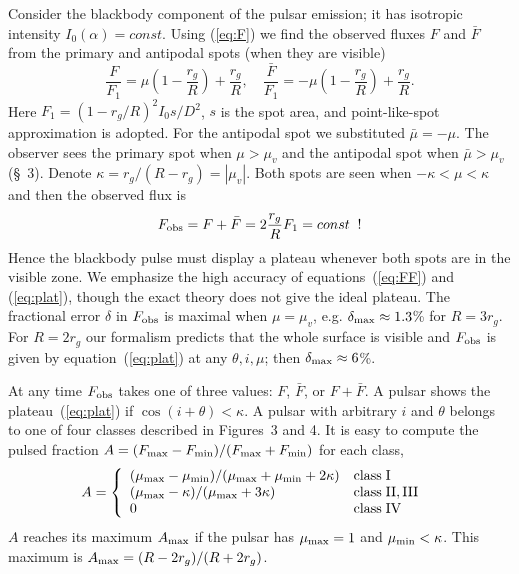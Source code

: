 \documentclass{article}
\def\mumin{\mu_{\rm min}}
\def\mumax{\mu_{\rm max}}
\def\Fmin{F_{\rm min}}
\def\Fmax{F_{\rm max}}
\def\Am{A_{\rm max}}
\def\Fobs{F_{\rm obs}}
\begin{document}
Consider the blackbody component of the pulsar emission; it has isotropic
intensity $I_0(\alpha)=const$. Using (\ref{eq:F}) we find 
the observed fluxes $F$ and $\bar{F}$ from the primary and antipodal spots 
(when they are visible) 
\begin{equation}
\label{eq:FF}
  \frac{F}{F_1}=\mu\left(1-\frac{r_g}{R}\right)+\frac{r_g}{R}, \quad
  \frac{\bar{F}}{F_1}=-\mu\left(1-\frac{r_g}{R}\right)+\frac{r_g}{R}.
\end{equation}
Here $F_1=(1-r_g/R)^2I_0s/D^2$, $s$ is the spot area, and 
point-like-spot approximation is adopted.
For the antipodal spot we substituted $\bar{\mu}=-\mu$.
The observer sees the primary spot when $\mu>\mu_v$ and the antipodal 
spot when $\bar{\mu}>\mu_v$ (\S~3).
Denote $\kappa=r_g/(R-r_g)=|\mu_v|$. Both spots are seen when 
$-\kappa<\mu<\kappa$ and then the observed flux is
\begin{equation}
\label{eq:plat} 
 \Fobs=F+\bar{F}=2\frac{r_g}{R}F_1=const {\rm \;\; !}
\end{equation}
Hence the blackbody pulse must display a plateau whenever both spots are 
in the visible zone. We emphasize the high accuracy of equations~(\ref{eq:FF}) 
and (\ref{eq:plat}), though the exact theory does not give the ideal plateau. 
The fractional error $\delta$ in $\Fobs$ is maximal when $\mu=\mu_v$, e.g. 
$\delta_{\rm max}\approx 1.3$\% for $R=3r_g$. For $R=2r_g$ our formalism 
predicts that the whole surface is visible and $\Fobs$ is given by 
equation~(\ref{eq:plat}) at any $\theta,i,\mu$; then $\delta_{\rm max}\approx 6$\%. 

At any time $\Fobs$ takes one of three values: $F$, $\bar{F}$, or $F+\bar{F}$. 
A pulsar shows the plateau~(\ref{eq:plat}) if $\cos(i+\theta)<\kappa$.
A pulsar with arbitrary $i$ and $\theta$ belongs to one of four classes 
described in Figures~3 and 4. It is easy to compute the pulsed fraction 
$A=(\Fmax-\Fmin)/(\Fmax+\Fmin)$ for each class,
\begin{eqnarray}
\label{eq:A}
A=\left\{ \begin{array}{ll}
    (\mumax-\mumin)/(\mumax+\mumin+2\kappa) & {\rm class\; I}\\
    (\mumax-\kappa)/(\mumax+3\kappa) & {\rm class\; II,III\;\;\;} \\
                 0              & {\rm class\; IV}
          \end{array}
       \right.
\end{eqnarray}
$A$ reaches its maximum $\Am$ if the pulsar has $\mumax=1$ and $\mumin<\kappa$.
This maximum is $\Am=(R-2r_g)/(R+2r_g)$.
\end{document}
